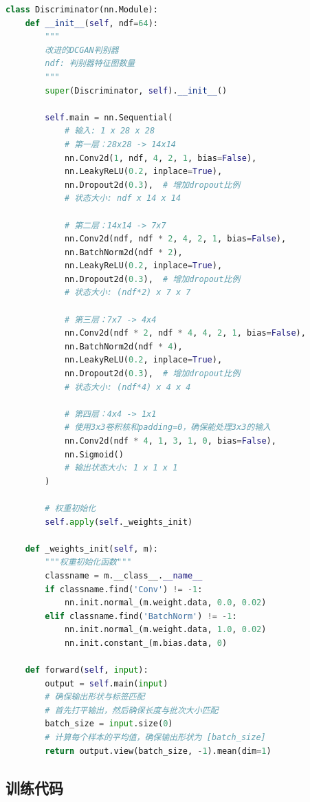 \documentclass[UTF8]{ctexart}
\begin{document}
\begin{lstlisting}[language=Python, caption=改进的卷积GAN生成器和判别器]
class Discriminator(nn.Module):
    def __init__(self, ndf=64):
        """
        改进的DCGAN判别器
        ndf: 判别器特征图数量
        """
        super(Discriminator, self).__init__()
        
        self.main = nn.Sequential(
            # 输入: 1 x 28 x 28
            # 第一层：28x28 -> 14x14
            nn.Conv2d(1, ndf, 4, 2, 1, bias=False),
            nn.LeakyReLU(0.2, inplace=True),
            nn.Dropout2d(0.3),  # 增加dropout比例
            # 状态大小: ndf x 14 x 14
            
            # 第二层：14x14 -> 7x7
            nn.Conv2d(ndf, ndf * 2, 4, 2, 1, bias=False),
            nn.BatchNorm2d(ndf * 2),
            nn.LeakyReLU(0.2, inplace=True),
            nn.Dropout2d(0.3),  # 增加dropout比例
            # 状态大小: (ndf*2) x 7 x 7
            
            # 第三层：7x7 -> 4x4
            nn.Conv2d(ndf * 2, ndf * 4, 4, 2, 1, bias=False),
            nn.BatchNorm2d(ndf * 4),
            nn.LeakyReLU(0.2, inplace=True),
            nn.Dropout2d(0.3),  # 增加dropout比例
            # 状态大小: (ndf*4) x 4 x 4
            
            # 第四层：4x4 -> 1x1
            # 使用3x3卷积核和padding=0，确保能处理3x3的输入
            nn.Conv2d(ndf * 4, 1, 3, 1, 0, bias=False),
            nn.Sigmoid()
            # 输出状态大小: 1 x 1 x 1
        )
        
        # 权重初始化
        self.apply(self._weights_init)
    
    def _weights_init(self, m):
        """权重初始化函数"""
        classname = m.__class__.__name__
        if classname.find('Conv') != -1:
            nn.init.normal_(m.weight.data, 0.0, 0.02)
        elif classname.find('BatchNorm') != -1:
            nn.init.normal_(m.weight.data, 1.0, 0.02)
            nn.init.constant_(m.bias.data, 0)
    
    def forward(self, input):
        output = self.main(input)
        # 确保输出形状与标签匹配
        # 首先打平输出，然后确保长度与批次大小匹配
        batch_size = input.size(0)
        # 计算每个样本的平均值，确保输出形状为 [batch_size]
        return output.view(batch_size, -1).mean(dim=1)
\end{lstlisting}

\subsection{训练代码}
\end{document}
